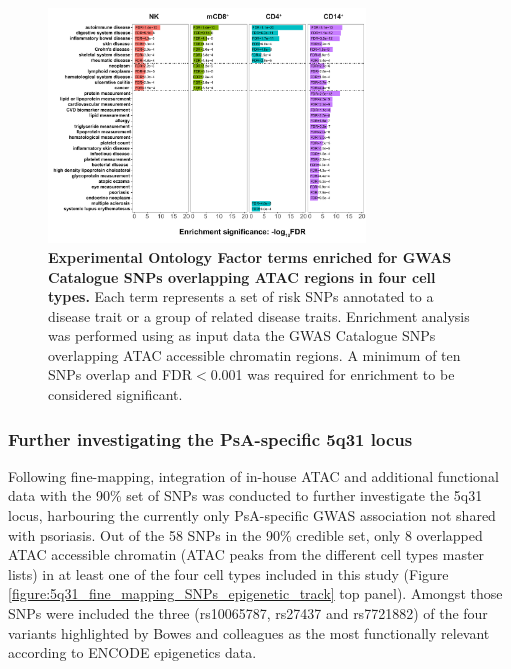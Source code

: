 \begin{figure}[htbp]
\centering
\includegraphics[width=0.75\textwidth]{./Results3/pdfs/Enrichment_for_FM_GWAS_cat_SNPs_overlapping_ATAC}
\caption[Experimental Factor Ontology terms enriched in GWAS Catalogue SNPs overlapping ATAC regions in four cell types.]{\textbf{Experimental Ontology Factor terms enriched for GWAS Catalogue SNPs overlapping ATAC regions in four cell types.} Each term represents a set of risk SNPs annotated to a disease trait or a group of related disease traits. Enrichment analysis was performed using as input data the GWAS Catalogue SNPs overlapping ATAC accessible chromatin regions. A minimum of ten SNPs overlap and FDR$<$0.001 was required for enrichment to be considered significant.}
\label{figure:GWAS_traits_enriched_for_ATAC_ML}
\end{figure}



\subsubsection{Further investigating the PsA-specific 5q31 locus}
Following fine-mapping, integration of in-house ATAC and additional functional data with the 90\% set of SNPs was conducted to further investigate the 5q31 locus, harbouring the currently only PsA-specific GWAS association not shared with psoriasis. Out of the 58 SNPs in the 90\% credible set, only 8 overlapped ATAC accessible chromatin (ATAC peaks from the different cell types master lists) in at least one of the four cell types included in this study (Figure \ref{figure:5q31_fine_mapping_SNPs_epigenetic_track} top panel). Amongst those SNPs were included the three (rs10065787, rs27437 and rs7721882) of the four variants highlighted by Bowes and colleagues as the most functionally relevant according to ENCODE epigenetics data. 



